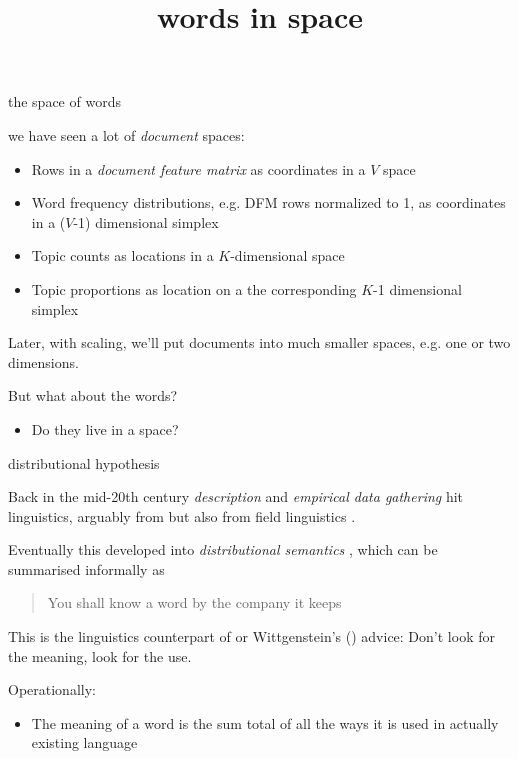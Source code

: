 \documentclass{hertieteaching}
\title{words in space}
\begin{document}
\maketitle

\begin{frame}{the space of words}

we have seen a lot of \textit{document} spaces:
\begin{itemize}
  \item Rows in a \textit{document feature matrix} as coordinates in a $V$ space
  \item Word frequency distributions, e.g. DFM rows normalized to 1, as coordinates in a ($V$-1) dimensional simplex 
  \item Topic counts as locations in a $K$-dimensional space
  \item Topic proportions as location on a the corresponding $K$-1 dimensional simplex
\end{itemize}
Later, with scaling, we'll put documents into much smaller spaces, e.g. one or two dimensions.

But what about the words?
\begin{itemize}
  \item Do they live in a space?
\end{itemize}

\end{frame}

\begin{frame}{distributional hypothesis}

Back in the mid-20th century \textit{description} and \textit{empirical data gathering} hit linguistics, arguably from \textcite[]{Zipf1932} but also from field linguistics \parencite{Harris1954}.

Eventually this developed into \textit{distributional semantics} \parencite[e.g.][]{Cruse1986,}, which can be summarised informally as

\bigskip
\begin{quote}
You shall know a word by the company it keeps \\
\hfill\parencite{Firth1968}
\end{quote}

This is the linguistics counterpart of \textcite{Quine1960} or Wittgenstein's (\citeyear{Wittgenstein1958}) advice: Don't look for the meaning, look for the use.

Operationally:
\begin{itemize}
  \item The meaning of a word is the sum total of all the ways it is used in actually existing language
\end{itemize}

\end{frame}
\end{document}

